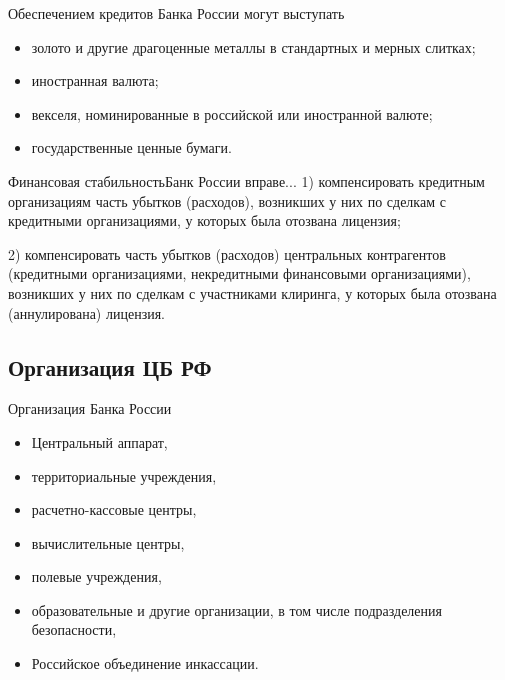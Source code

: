 \documentclass[_DKB_p1_Money.tex]{subfiles}
\begin{document}
\begin{frame}{Обеспечением кредитов Банка России могут выступать}
\begin{itemize}
\item
золото и другие драгоценные металлы в стандартных и мерных слитках;
\item
иностранная валюта;
\item
векселя, номинированные в российской или иностранной валюте;
\item
государственные ценные бумаги.
\end{itemize}
\end{frame}
\begin{frame}{Финансовая стабильность}{Банк России вправе...}
1) компенсировать кредитным организациям часть убытков (расходов), возникших у них по сделкам с кредитными организациями, у которых была отозвана лицензия;

2) компенсировать часть убытков (расходов) центральных контрагентов (кредитными организациями, некредитными финансовыми организациями), возникших у них по сделкам с участниками клиринга, у которых была отозвана (аннулирована) лицензия.
\end{frame}

\subsection{Организация ЦБ РФ}
\begin{frame}{Организация Банка России}
\begin{itemize}
\item
Центральный аппарат, 
\item
территориальные учреждения, 
\item
расчетно-кассовые центры, 
\item
вычислительные центры, 
\item
полевые учреждения, 
\item
образовательные и другие организации, в том числе подразделения безопасности,
\item
Российское объединение инкассации.
\end{itemize}
\end{frame}

\end{document}
